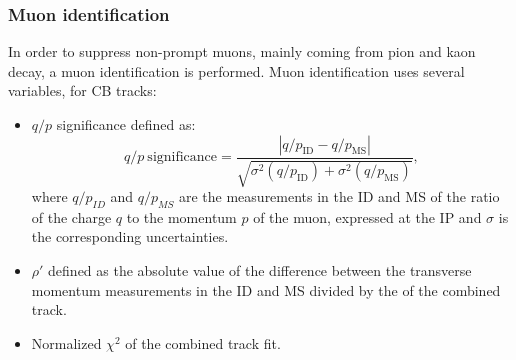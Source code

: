 \subsubsection{Muon identification}
\label{chap2:Objects:Muon:ID}
In order to suppress non-prompt muons, mainly coming from pion and kaon decay, a muon identification is performed. Muon identification uses several variables, for CB tracks:
\begin{itemize}
    \item $q/p$ significance defined as: 
    \begin{equation}
       q/p \ \text{significance}=\frac{\left|q / p_{\mathrm{ID}}-q / p_{\mathrm{MS}}\right|}{\sqrt{\sigma^{2}\left(q / p_{\mathrm{ID}}\right)+\sigma^{2}\left(q / p_{\mathrm{MS}}\right)}},
    \end{equation}
    where $q/p_{ID}$ and $q/p_{MS}$ are the measurements in the ID and MS of the ratio of the charge $q$ to the momentum $p$ of the muon, expressed at the IP and $\sigma$ is the corresponding uncertainties. 
    \item $\rho'$ defined as the absolute value of the difference between the transverse momentum measurements in the ID and MS divided by the \pT of the combined track.
    \item Normalized $\chi^2$ of the combined track fit. 
\end{itemize}


